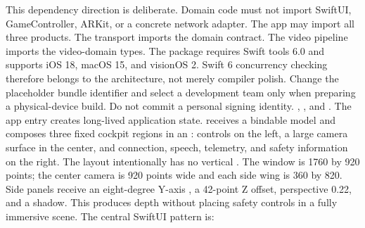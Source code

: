 {}This dependency direction is deliberate. Domain code must not import SwiftUI, GameController, ARKit, or a concrete network adapter. The app may import all three products. The transport imports the domain contract. The video pipeline imports the video-domain types.\markdownRendererParagraphSeparator
{}The package requires Swift tools 6.0 and supports iOS 18, macOS 15, and visionOS 2. Swift 6 concurrency checking therefore belongs to the architecture, not merely compiler polish.\markdownRendererInterblockSeparator
{}\markdownRendererSectionBegin
{}\markdownRendererInterblockSeparator
{}\markdownRendererInterblockSeparator
{}Change the placeholder bundle identifier and select a development team only when preparing a physical-device build. Do not commit a personal signing identity.\markdownRendererInterblockSeparator
{}
\markdownRendererSectionEnd 
\markdownRendererSectionEnd \markdownRendererSectionBegin
{}\markdownRendererInterblockSeparator
{}\markdownRendererBlockQuoteBegin
{} , , and .\markdownRendererBlockQuoteEnd \markdownRendererInterblockSeparator
{}The app entry creates long-lived application state.  receives a bindable model and composes three fixed cockpit regions in an : controls on the left, a large camera surface in the center, and connection, speech, telemetry, and safety information on the right.\markdownRendererParagraphSeparator
{}The layout intentionally has no vertical . The window is 1760 by 920 points; the center camera is 920 points wide and each side wing is 360 by 820. Side panels receive an eight-degree Y-axis , a 42-point Z offset, perspective 0.22, and a shadow. This produces depth without placing safety controls in a fully immersive scene.\markdownRendererParagraphSeparator
{}The central SwiftUI pattern is:\markdownRendererInterblockSeparator
{}\markdownRendererInterblockSeparator
